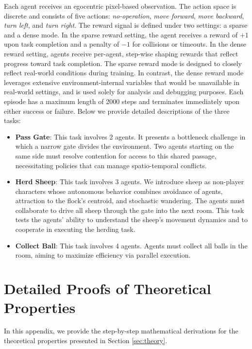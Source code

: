 \documentclass[11pt]{article}
\begin{document}
Each agent receives an egocentric pixel-based observation. The action space is discrete and consists of five actions: \textit{no-operation}, \textit{move forward}, \textit{move backward}, \textit{turn left}, and \textit{turn right}. The reward signal is defined under two settings: a sparse and a dense mode. In the sparse reward setting, the agent receives a reward of $+1$ upon task completion and a penalty of $-1$ for collisions or timeouts. In the dense reward setting, agents receive per-agent, step-wise shaping rewards that reflect progress toward task completion. The sparse reward mode is designed to closely reflect real-world conditions during training. In contrast, the dense reward mode leverages extensive environment-internal variables that would be unavailable in real-world settings, and is used solely for analysis and debugging purposes. Each episode has a maximum length of 2000 steps and terminates immediately upon either success or failure. Below we provide detailed descriptions of the three tasks:

\begin{itemize}[noitemsep, topsep=0pt, leftmargin=*]
    \item \textbf{Pass Gate}: This task involves 2 agents. It presents a bottleneck challenge in which a narrow gate divides the environment. Two agents starting on the same side must resolve contention for access to this shared passage, necessitating policies that can manage spatio-temporal conflicts.
    \item \textbf{Herd Sheep}: This task involves 3 agents. We introduce sheep as non-player characters whose autonomous behavior combines avoidance of agents, attraction to the flock's centroid, and stochastic wandering. The agents must collaborate to drive all sheep through the gate into the next room. This task tests the agents’ ability to understand the sheep’s movement dynamics and to cooperate in executing the herding task.
    \item \textbf{Collect Ball}: This task involves 4 agents. Agents must collect all balls in the room, aiming to maximize efficiency via parallel execution.
\end{itemize}




\section{Detailed Proofs of Theoretical Properties}
\label{appendix:proofs}

In this appendix, we provide the step-by-step mathematical derivations for the theoretical properties presented in Section \ref{sec:theory}.
\end{document}
